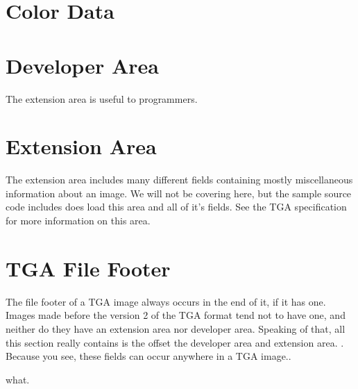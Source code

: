 \begin{refsection}
\section{Color Data}
\label{sec:color-data}




\section{Developer Area}

The extension area is useful to programmers.

\section{Extension Area}

The extension area includes many different fields containing mostly
miscellaneous information about an image. We will not be covering
here, but the sample source code includes does load this area and
all of it's fields. See the TGA specification for more information
on this area.

\section{TGA File Footer}

The file footer of a TGA image always occurs in the end of it, if it
has one. Images made before the version 2 of the TGA format tend not
to have one, and neither do they have an extension area nor
developer area. Speaking of that, all this section really contains
is the offset the developer area and extension area. . Because you see, these fields can occur
anywhere in a TGA image..

what.

\printbibliography[heading=subbibliography]

\end{refsection}